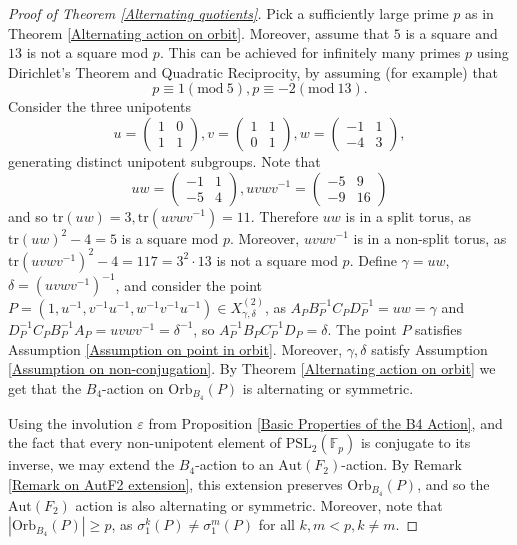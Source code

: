 \documentclass[letterpaper]{amsart}
\begin{document}
\begin{proof}[Proof of Theorem \ref{Alternating quotients}]
    Pick a sufficiently large prime $p$ as in Theorem \ref{Alternating action on orbit}. Moreover, assume that $5$ is a square and $13$ is not a square mod $p$. This can be achieved for infinitely many primes $p$ using Dirichlet's Theorem and Quadratic Reciprocity, by assuming (for example) that $$ p \equiv 1 (\mathrm{mod}\ 5), p \equiv -2 (\mathrm{mod}\ 13).$$
    Consider the three unipotents $$u = \begin{pmatrix}1 & 0 \\ 1 & 1\end{pmatrix}, v = \begin{pmatrix} 1 & 1 \\ 0 & 1\end{pmatrix}, w = \begin{pmatrix}-1 & 1 \\ -4 & 3\end{pmatrix},$$generating distinct unipotent subgroups. Note that $$uw = \begin{pmatrix}-1 & 1 \\ -5 & 4\end{pmatrix}, uvwv^{-1} = \begin{pmatrix}-5 & 9 \\ -9 & 16\end{pmatrix}$$ and so $\mathrm{tr}(uw) = 3, \mathrm{tr}(uvwv^{-1}) = 11$. Therefore $uw$ is in a split torus, as $\mathrm{tr}(uw)^2 - 4 = 5$ is a square mod $p.$ Moreover, $uvwv^{-1}$ is in a non-split torus, as $\mathrm{tr}(uvwv^{-1})^2 - 4 = 117 = 3^2 \cdot 13$ is not a square mod $p.$ Define $\gamma = uw$, $\delta = (uvwv^{-1})^{-1}$, and consider the point $P = (1, u^{-1}, v^{-1}u^{-1}, w^{-1}v^{-1}u^{-1}) \in X^{(2)}_{\gamma,\delta}$, as $A_PB_P^{-1}C_PD_P^{-1} = uw=\gamma$ and $D_P^{-1}C_PB_P^{-1}A_P = uvwv^{-1} = \delta^{-1}$, so $A_P^{-1}B_PC_P^{-1}D_P = \delta$. The point $P$ satisfies Assumption \ref{Assumption on point in orbit}. Moreover, $\gamma,\delta$ satisfy Assumption \ref{Assumption on non-conjugation}. By Theorem \ref{Alternating action on orbit} we get that the $B_4$-action on $\mathrm{Orb}_{B_4}(P)$ is alternating or symmetric.

    Using the involution $\varepsilon$ from Proposition \ref{Basic Properties of the B4 Action}, and the fact that every non-unipotent element of $\mathrm{PSL}_2(\mathbb{F}_p)$ is conjugate to its inverse, we may extend the $B_4$-action to an $\mathrm{Aut}(F_2)$-action. By Remark \ref{Remark on AutF2 extension}, this extension preserves $\mathrm{Orb}_{B_4}(P)$, and so the $\mathrm{Aut}(F_2)$ action is also alternating or symmetric. Moreover, note that $|\mathrm{Orb}_{B_4}(P)| \geq p$, as $\sigma_1^k(P) \neq \sigma_1^m(P)$ for all $k,m < p, k \neq m$.


\end{proof}
\end{document}
